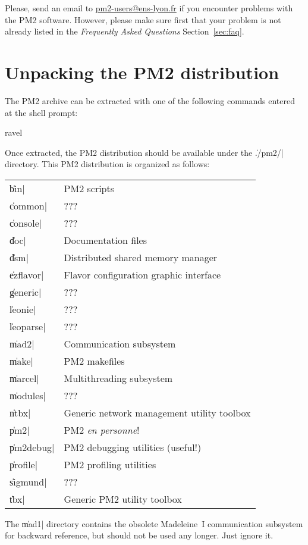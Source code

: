 Please, send an email to \url{pm2-users@ens-lyon.fr} if you encounter
problems with the PM2 software. However, please make sure first that
your problem is not already listed in the \emph{Frequently Asked
  Questions} Section~\ref{sec:faq}.

\section{Unpacking the PM2 distribution}

The PM2 archive can be extracted with one of the following commands
entered at the shell prompt:
\begin{shell}
ravel%
\end{shell}
Once extracted, the PM2 distribution should be available under the
\|./pm2/| directory. This PM2 distribution is organized as follows:
\begin{center}
\begin{tabular}{|l|l|}
\hline 
\|bin| &        PM2 scripts \\
\|common| &     ??? \\
\|console| &    ??? \\
\|doc| &        Documentation files \\
\|dsm| &        Distributed shared memory manager \\
\|ezflavor| &   Flavor configuration graphic interface \\
\|generic| &    ??? \\
\|leonie| &     ??? \\
\|leoparse| &   ??? \\
\|mad2| &       Communication subsystem \\
\|make| &       PM2 makefiles \\
\|marcel| &     Multithreading subsystem \\
\|modules| &    ??? \\
\|ntbx| &       Generic network management utility toolbox \\
\|pm2| &        PM2 \emph{en personne}! \\
\|pm2debug| &   PM2 debugging utilities (useful!) \\
\|profile| &    PM2 profiling utilities \\
\|sigmund| &    ??? \\
\|tbx| &        Generic PM2 utility toolbox \\
\hline
\end{tabular}
\end{center}
The \|mad1| directory contains the obsolete Madeleine~I communication
subsystem for backward reference, but should not be used any
longer. Just ignore it.

